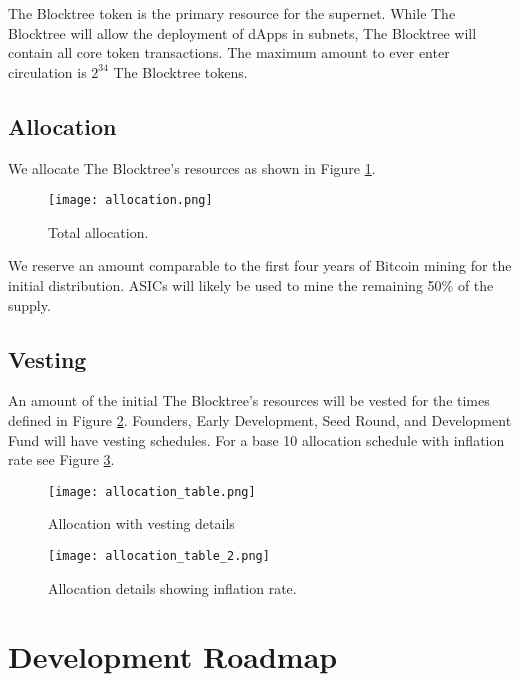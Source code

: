 \documentclass[12pt]{article}
\begin{document}
The Blocktree token is the primary resource for the supernet. While The Blocktree will allow the deployment of dApps in subnets, The Blocktree will contain all core token transactions. The maximum amount to ever enter circulation is $2^{34}$ The Blocktree tokens.

\subsection{Allocation}

We allocate The Blocktree's resources as shown in Figure \ref{fig:allocation}. 

\begin{figure}[h!]
\centering
  \texttt{[image: allocation.png]}
  \caption{Total allocation.}
  \label{fig:allocation}
\end{figure}

We reserve an amount comparable to the first four years of Bitcoin mining for the initial distribution.  ASICs will likely be used to mine the remaining 50\% of the supply.



\subsection{Vesting}

An amount of the initial The Blocktree's resources will be vested for the times defined in Figure \ref{fig:allocation_table}. Founders, Early Development, Seed Round, and Development Fund will have vesting schedules. For a base 10 allocation schedule with inflation rate see Figure \ref{fig:allocation_table2}.



\begin{figure}[H]
\centering
  \texttt{[image: allocation\_table.png]}
  \caption{Allocation with vesting details}
  \label{fig:allocation_table}
\end{figure}

 \thispagestyle{empty} 

\begin{figure}[H]
\centering
  \texttt{[image: allocation\_table\_2.png]}
  \caption{Allocation details showing inflation rate.}
  \label{fig:allocation_table2}
\end{figure}
 \thispagestyle{empty} 






\section{Development Roadmap}
\end{document}
